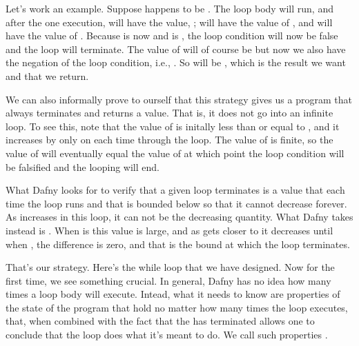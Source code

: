 \documentclass[letterpaper,10pt,english]{sphinxmanual}
\begin{document}
Let’s work an example. Suppose  happens to be . The loop body
will run, and after the one execution,  will have the value, ;
 will have the value of , and  will have the value
of . Because  is now  and  is , the loop condition
will now be false and the loop will terminate. The value of 
will of course be  but now we also have the negation of the
loop condition, i.e., . So  will be , which is
the result we want and that we return.

We can also informally prove to ourself that this strategy gives us a
program that always terminates and returns a value. That is, it does
not go into an infinite loop. To see this, note that the value of 
is initally less than or equal to , and it increases by only  on
each time through the loop. The value of  is finite, so the value
of  will eventually equal the value of  at which point the loop
condition will be falsified and the looping will end.

What Dafny looks for to verify that a given loop terminates is a value
that  each time the loop runs and that is bounded below so
that it cannot decrease forever. As  increases in this loop, it can
not be the decreasing quantity. What Dafny takes instead is .
When  is  this value is large, and as  gets closer to  it
decreases until when , the difference is zero, and that is the
bound at which the loop terminates.

That’s our strategy. Here’s the while loop that we have designed. Now
for the first time, we see something crucial. In general, Dafny has no
idea how many times a loop body will execute. Intead, what it needs to
know are properties of the state of the program that hold no matter
how many times the loop executes, that, when combined with the fact
that the has terminated allows one to conclude that the loop does what
it’s meant to do. We call such properties .
\end{document}
